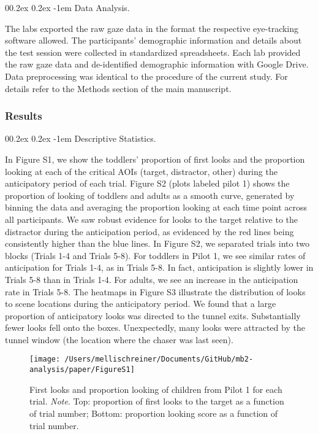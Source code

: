 \documentclass[
  man, donotrepeattitle,floatsintext]{apa6}
\makeatletter
\let\oldparagraph\paragraph
\renewcommand{\paragraph}{
    \@ifstar
      \xxxParagraphStar
      \xxxParagraphNoStar
  }
\newcommand{\xxxParagraphStar}[1]{\oldparagraph*{#1}\mbox{}}
\newcommand{\xxxParagraphNoStar}[1]{\oldparagraph{#1}\mbox{}}
\renewcommand{\paragraph}{\@startsection{paragraph}{4}{\parindent}%
  {0\baselineskip \@plus 0.2ex \@minus 0.2ex}%
  {-1em}%
  {\normalfont\normalsize\bfseries\itshape\typesectitle}}
\makeatother
\begin{document}
\paragraph{Data Analysis.}\label{data-analysis.}

The labs exported the raw gaze data in the format the respective eye-tracking software allowed. The participants' demographic information and details about the test session were collected in standardized spreadsheets. Each lab provided the raw gaze data and de-identified demographic information with Google Drive. Data preprocessing was identical to the procedure of the current study. For details refer to the Methods section of the main manuscript.

\subsubsection{Results}\label{results}

\paragraph{Descriptive Statistics.}\label{descriptive-statistics.}

In Figure S1, we show the toddlers' proportion of first looks and the proportion looking at each of the critical AOIs (target, distractor, other) during the anticipatory period of each trial. Figure S2 (plots labeled pilot 1) shows the proportion of looking of toddlers and adults as a smooth curve, generated by binning the data and averaging the proportion looking at each time point across all participants. We saw robust evidence for looks to the target relative to the distractor during the anticipation period, as evidenced by the red lines being consistently higher than the blue lines. In Figure S2, we separated trials into two blocks (Trials 1-4 and Trials 5-8). For toddlers in Pilot 1, we see similar rates of anticipation for Trials 1-4, as in Trials 5-8. In fact, anticipation is slightly lower in Trials 5-8 than in Trials 1-4. For adults, we see an increase in the anticipation rate in Trials 5-8.
The heatmaps in Figure S3 illustrate the distribution of looks to scene locations during the anticipatory period. We found that a large proportion of anticipatory looks was directed to the tunnel exits. Substantially fewer looks fell onto the boxes. Unexpectedly, many looks were attracted by the tunnel window (the location where the chaser was last seen).

\begin{figure}

\texttt{[image: /Users/mellischreiner/Documents/GitHub/mb2-analysis/paper/FigureS1]} \hfill{}

\caption{First looks and proportion looking of children from Pilot 1 for each trial. \newline{} \textit{Note}. Top: proportion of first looks to the target as a function of trial number; Bottom: proportion looking score as a function of trial number.}\label{fig:figS1}
\end{figure}
\end{document}

